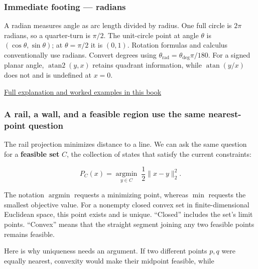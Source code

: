 \subsubsection{Immediate footing --- radians}\label{01-foundations-i-ch017-immediate-footing-radians}

\hypertarget{01-foundations-i-ch017-immediate-footing-radians}{}

A radian measures angle as arc length divided by radius. One full circle is \(2\pi\) radians, so a quarter-turn is \(\pi/2\). The unit-circle point at angle \(\theta\) is \((\cos\theta,\sin\theta)\); at \(\theta=\pi/2\) it is \((0,1)\). Rotation formulas and calculus conventionally use radians. Convert degrees using \(\theta_{\mathrm{rad}}=\theta_{\mathrm{deg}}\pi/180\). For a signed planar angle, \(\operatorname{atan2}(y,x)\) retains quadrant information, while \(\operatorname{atan}(y/x)\) does not and is undefined at \(x=0\).

\hyperref[01-foundations-i-ch017-rotation-first-becomes-understandable-in-a-plane]{Full explanation and worked examples in this book}

\subsubsection{A rail, a wall, and a feasible region use the same nearest-point question}\label{01-foundations-i-ch017-a-rail-a-wall-and-a-feasible-region-use-the-same-nearest-point-question}

\hypertarget{01-foundations-i-ch017-a-rail-a-wall-and-a-feasible-region-use-the-same-nearest-point-question}{}

The rail projection minimizes distance to a line. We can ask the same question for a \textbf{feasible set} \(C\), the collection of states that satisfy the current constraints:

\[
P_C(x)=\underset{y\in C}{\operatorname{argmin}}\;\frac12\|x-y\|_2^2.
\]

The notation \(\operatorname{argmin}\) requests a minimizing point, whereas \(\min\) requests the smallest objective value. For a nonempty closed convex set in finite-dimensional Euclidean space, this point exists and is unique. ``Closed'' includes the set's limit points. ``Convex'' means that the straight segment joining any two feasible points remains feasible.

Here is why uniqueness needs an argument. If two different points \(p,q\) were equally nearest, convexity would make their midpoint feasible, while

